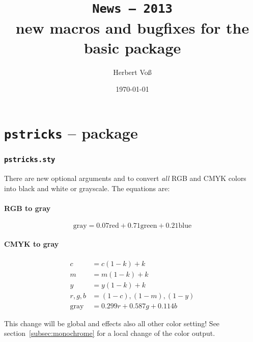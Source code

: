 \documentclass[11pt,english,BCOR10mm,DIV12,bibliography=totoc,parskip=false,smallheadings
    headexclude,footexclude,oneside]{pst-doc}
\begin{document}
\title{\texttt{News -- 2013}\\ \Large new macros and bugfixes for the
basic package }
\author{Herbert Voß}
\date{\today}

\maketitle

\clearpage
\tableofcontents

\clearpage
\part{\texttt{pstricks} -- package}

\section{\texttt{pstricks.sty}}

There are new optional arguments  and  to convert \emph{all} RGB and CMYK colors
into black and white or grayscale. The equations are:

\subsection{RGB to gray}
\[ \text{gray} = 0.07 \text{red} + 0.71 \text{green} + 0.21 \text{blue} \]

\subsection{CMYK to gray}
\begin{align*} 
    c &= c  (1 - k) + k\\
    m &= m  (1 - k) + k\\
    y &= y  (1 - k) + k\\
    r, g, b &= (1 - c), (1 - m), (1 - y)\\
  \text{gray} &= 0.299 r + 0.587 g + 0.114 b
\end{align*}

This change will be global and effects also all other color setting!
See section~\vref{subsec:monochrome} for a local change of the color output.

\end{document}
